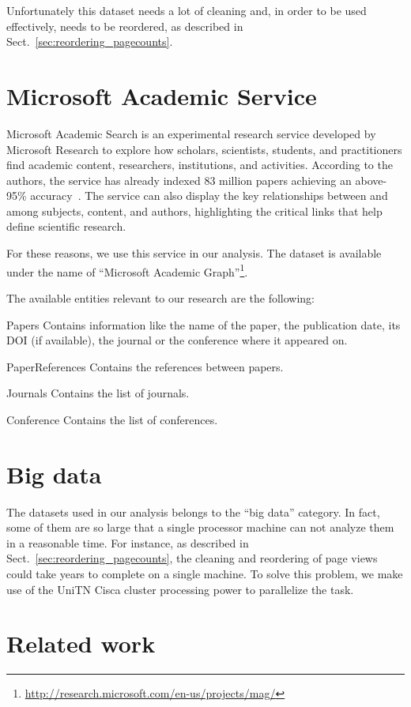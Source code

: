 Unfortunately this dataset needs a lot of cleaning and, in order to be used effectively, needs to be reordered, as described in Sect.~\ref{sec:reordering_pagecounts}.

\section{Microsoft Academic Service}
\label{sec:mag}
Microsoft Academic Search is an experimental research service developed by Microsoft Research to explore how scholars, scientists, students, and practitioners find academic content, researchers, institutions, and activities.
According to the authors, the service has already indexed 83 million papers achieving an above-95\% accuracy~\cite{Sinha2015}.
The service can also display the key relationships between and among subjects, content, and authors, highlighting the critical links that help define scientific research.

For these reasons, we use this service in our analysis.
The dataset is available under the name of ``Microsoft Academic Graph''\footnote{\url{http://research.microsoft.com/en-us/projects/mag/}}.

The available entities relevant to our research are the following:
\begin{description*}
    \item[Papers] Contains information like the name of the paper, the publication date, its \ac{DOI} (if available), the journal or the conference where it appeared on.
    \item[PaperReferences] Contains the references between papers.
    \item[Journals] Contains the list of journals.
    \item[Conference] Contains the list of conferences.
\end{description*}


\section{Big data}
\label{sec:bigdata}


The datasets used in our analysis belongs to the ``big data'' category.
In fact, some of them are so large that a single processor machine can not analyze them in a reasonable time.
For instance, as described in Sect.~\ref{sec:reordering_pagecounts}, the cleaning and reordering of page views could take years  to complete on a single machine.
To solve this problem, we make use of the UniTN Cisca cluster processing power to parallelize the task.


\section{Related work}
\label{sec:relatedwork}
